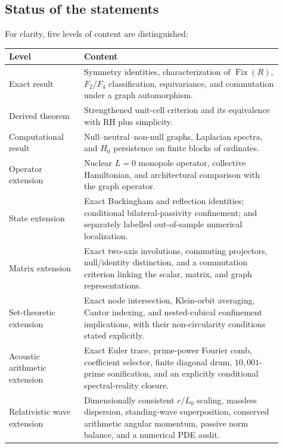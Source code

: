 \documentclass[11pt]{amsart}
\theoremstyle{definition}
\theoremstyle{remark}
\begin{document}
\subsection{Status of the statements}
For clarity, five levels of content are distinguished:
\begin{center}
\begin{tabular}{p{0.25\linewidth}p{0.66\linewidth}}
\toprule
\textbf{Level} & \textbf{Content}\\
\midrule
Exact result & Symmetry identities, characterization of $\operatorname{Fix}(R)$, $F_2/F_4$ classification, equivariance, and commutation under a graph automorphism.\\
Derived theorem & Strengthened unit-cell criterion and its equivalence with RH plus simplicity.\\
Computational result & Null--neutral--non-null graphs, Laplacian spectra, and $H_0$ persistence on finite blocks of ordinates.\\
Operator extension & Nuclear $L=0$ monopole operator, collective Hamiltonian, and architectural comparison with the graph operator.\\
State extension & Exact Buckingham and reflection identities; conditional bilateral-passivity confinement; and separately labelled out-of-sample numerical localization.\\
Matrix extension & Exact two-axis involutions, commuting projectors, null/identity distinction, and a commutation criterion linking the scalar, matrix, and graph representations.\\
Set-theoretic extension & Exact node intersection, Klein-orbit averaging, Cantor indexing, and nested-cubical confinement implications, with their non-circularity conditions stated explicitly.\\
Acoustic arithmetic extension & Exact Euler trace, prime-power Fourier comb, coefficient selector, finite diagonal drum, $10{,}001$-prime sonification, and an explicitly conditional spectral-reality closure.\\
Relativistic wave extension & Dimensionally consistent $c/L_0$ scaling, massless dispersion, standing-wave superposition, conserved arithmetic angular momentum, passive norm balance, and a numerical PDE audit.\\
\bottomrule
\end{tabular}
\end{center}
\end{document}
